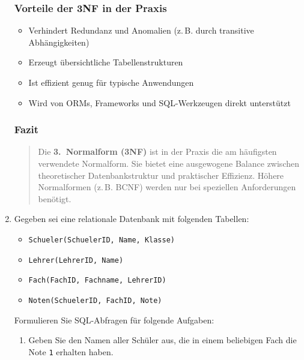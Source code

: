 \documentclass[a4paper,12pt]{article}
\begin{document}
\begin{enumerate}
			\vspace{1em}
			
			\subsubsection*{Vorteile der 3NF in der Praxis}
			
			\begin{itemize}
				\item Verhindert Redundanz und Anomalien (z.\,B. durch transitive Abhängigkeiten)
				\item Erzeugt übersichtliche Tabellenstrukturen
				\item Ist effizient genug für typische Anwendungen
				\item Wird von ORMs, Frameworks und SQL-Werkzeugen direkt unterstützt
			\end{itemize}
			
			\vspace{1em}
			
			\subsubsection*{Fazit}
			
			\begin{quote}
				Die \textbf{3.\ Normalform (3NF)} ist in der Praxis die am häufigsten verwendete Normalform. Sie bietet eine ausgewogene Balance zwischen theoretischer Datenbankstruktur und praktischer Effizienz. Höhere Normalformen (z.\,B. BCNF) werden nur bei speziellen Anforderungen benötigt.
			\end{quote}
			
			\item Gegeben sei eine relationale Datenbank mit folgenden Tabellen:
			
			\begin{itemize}
				\item \texttt{Schueler(SchuelerID, Name, Klasse)}
				\item \texttt{Lehrer(LehrerID, Name)}
				\item \texttt{Fach(FachID, Fachname, LehrerID)}
				\item \texttt{Noten(SchuelerID, FachID, Note)}
			\end{itemize}
			
			Formulieren Sie SQL-Abfragen für folgende Aufgaben:
			
			\begin{enumerate}
				\item Geben Sie den Namen aller Schüler aus, die in einem beliebigen Fach die Note \texttt{1} erhalten haben.
				

\end{enumerate}
\end{enumerate}
\end{document}
